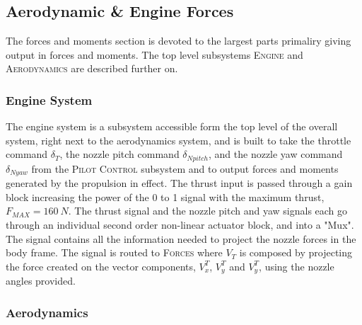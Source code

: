 \subsection{Aerodynamic \& Engine Forces}

The forces and moments section is devoted to the largest parts primaliry giving output in forces and moments. The top level subsystems \textsc{Engine} and \textsc{Aerodynamics} are described further on.

\subsubsection{Engine System}

The engine system is a subsystem accessible form the top level of the overall system, right next to the aerodynamics system, and is built to take the throttle command $\delta_{T}$, the nozzle pitch command $\delta_{Npitch}$, and the nozzle yaw command $\delta_{Nyaw}$ from the \textsc{Pilot Control} subsystem and to output forces and moments generated by the propulsion in effect. The thrust input is passed through a gain block increasing the power of the 0 to 1 signal with the maximum thrust, $F_{MAX}=160~N$. The thrust signal and the nozzle pitch and yaw signals each go through an individual second order non-linear actuator block, and into a "Mux". The signal contains all the information needed to project the nozzle forces in the body frame. The signal is routed to \textsc{Forces} where \textbf{$V_T$} is composed by projecting the force created on the vector components, $V^T_x$, $V^T_y$ and $V^T_y$, using the nozzle angles provided.




\subsubsection{Aerodynamics}

